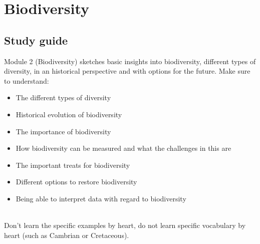 \documentclass[../summary.tex]{subfiles}
\begin{document}
	
	\section{Biodiversity}
	
	\subsection{Study guide}
	
	Module 2 (Biodiversity) sketches basic insights into biodiversity, different types of diversity, in an historical perspective and with options for the future. Make sure to understand:
	\begin{itemize}
		\setlength{\itemsep}{0pt}
		\item The different types of diversity
		\item Historical evolution of biodiversity
		\item The importance of biodiversity
		\item How biodiversity can be measured and what the challenges in this are
		\item The important treats for biodiversity
		\item Different options to restore biodiversity
		\item Being able to interpret data with regard to biodiversity
	\end{itemize} 
	\ \\
	Don’t learn the specific examples by heart, do not learn specific vocabulary by heart (such as Cambrian or Cretaceous).
	\\
	
\end{document}
